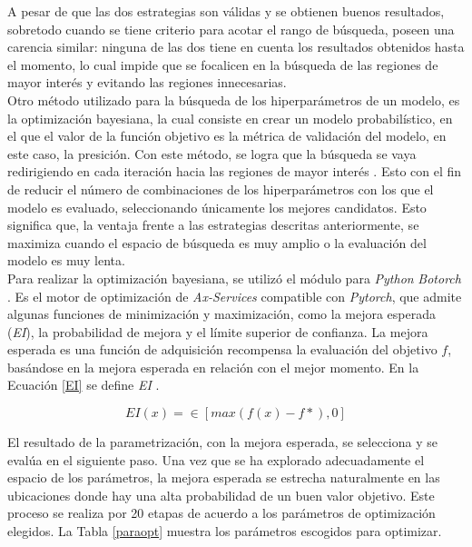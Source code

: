 A pesar de que las dos estrategias son válidas y se obtienen buenos resultados, sobretodo cuando se tiene criterio para acotar el rango de búsqueda, poseen una carencia similar: ninguna de las dos tiene en cuenta los resultados obtenidos hasta el momento, lo cual impide que se focalicen en la búsqueda de las regiones de mayor interés y evitando las regiones innecesarias.\\


Otro método utilizado para la búsqueda de los hiperparámetros de un modelo, es la optimización bayesiana, la cual consiste en crear un modelo probabilístico, en el que el valor de la función objetivo es la métrica de validación del modelo, en este caso, la presición. Con este método, se logra que la búsqueda se vaya redirigiendo en cada iteración hacia las regiones de mayor interés \cite{frazier2018tutorial}. Esto con el fin de reducir el número de combinaciones de los hiperparámetros con los que el modelo es evaluado, seleccionando únicamente los mejores candidatos. Esto significa que, la ventaja frente a las estrategias descritas anteriormente, se maximiza cuando el espacio de búsqueda es muy amplio o la evaluación del modelo es muy lenta.\\

Para realizar la optimización bayesiana, se utilizó el módulo para \textit{Python} \textit{Botorch}  \cite{balandat2020botorch}. Es el motor de optimización de \textit{Ax-Services} compatible con \textit{Pytorch}, que admite algunas funciones de minimización y maximización, como la mejora esperada (\textit{EI}), la probabilidad de mejora y el límite superior de confianza. La mejora esperada es una función de adquisición recompensa la evaluación del objetivo $f$, basándose en la mejora esperada en relación con el mejor momento. En la Ecuación \ref{EI} se define  \textit{EI} .

\begin{equation}
	{EI(x)=\in[max(f(x)-f*),0]}
	\label{EI}
\end{equation}

El resultado de la parametrización, con la mejora esperada, se selecciona y se evalúa en el siguiente paso. Una vez que se ha explorado adecuadamente el espacio de los parámetros, la mejora esperada se estrecha naturalmente en las ubicaciones donde hay una alta probabilidad de un buen valor objetivo. Este proceso se realiza por 20 etapas de acuerdo a los parámetros de optimización elegidos. La Tabla \ref{paraopt} muestra los parámetros escogidos para optimizar.

